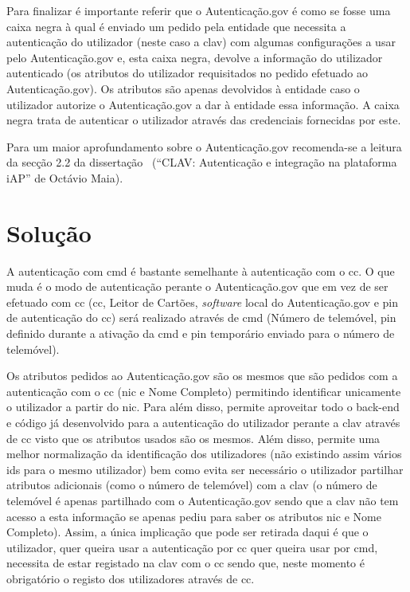 Para finalizar é importante referir que o Autenticação.gov é como se fosse uma caixa negra à qual é enviado um 
pedido pela entidade que necessita a autenticação do utilizador (neste caso a \acrshort{clav}) com algumas 
configurações a usar pelo Autenticação.gov e, esta caixa negra, devolve a informação do utilizador autenticado 
(os atributos do utilizador requisitados no pedido efetuado ao Autenticação.gov). Os atributos são apenas 
devolvidos à entidade caso o utilizador autorize o Autenticação.gov a dar à entidade essa informação. 
A caixa negra trata de autenticar o utilizador através das credenciais fornecidas por este.

Para um maior aprofundamento sobre o Autenticação.gov recomenda-se a leitura da secção 2.2 da 
dissertação~\cite{otavioTese} (``CLAV: Autenticação e integração na plataforma iAP'' de Octávio Maia).

\section{Solução}

A autenticação com \acrshort{cmd} é bastante semelhante à autenticação com o \acrshort{cc}. 
O que muda é o modo de autenticação perante o Autenticação.gov que em vez de ser efetuado com \acrshort{cc} 
(\acrlong{cc}, Leitor de Cartões, \textit{software} local do Autenticação.gov e \acrshort{pin} de autenticação 
do \acrshort{cc}) será realizado através de \acrshort{cmd} (Número de telemóvel, \acrshort{pin} definido durante 
a ativação da \acrshort{cmd} e \acrshort{pin} temporário enviado para o número de telemóvel).

Os atributos pedidos ao Autenticação.gov são os mesmos que são pedidos com a autenticação com o \acrshort{cc} 
(\acrshort{nic} e Nome Completo) permitindo identificar unicamente o utilizador a partir do \acrshort{nic}. 
Para além disso, permite aproveitar todo o back-end e código já desenvolvido para a autenticação do utilizador 
perante a \acrshort{clav} através de \acrshort{cc} visto que os atributos usados são os mesmos. 
Além disso, permite uma melhor normalização da identificação dos utilizadores (não existindo assim vários ids 
para o mesmo utilizador) bem como evita ser necessário o utilizador partilhar atributos adicionais (como o 
número de telemóvel) com a \acrshort{clav} (o número de telemóvel é apenas partilhado com o Autenticação.gov 
sendo que a \acrshort{clav} não tem acesso a esta informação se apenas pediu para saber os atributos 
\acrshort{nic} e Nome Completo). Assim, a única implicação que pode ser retirada daqui é que o utilizador, 
quer queira usar a autenticação por \acrshort{cc} quer queira usar por \acrshort{cmd}, necessita de estar 
registado na \acrshort{clav} com o \acrshort{cc} sendo que, neste momento é obrigatório o registo dos utilizadores 
através de \acrshort{cc}. 

